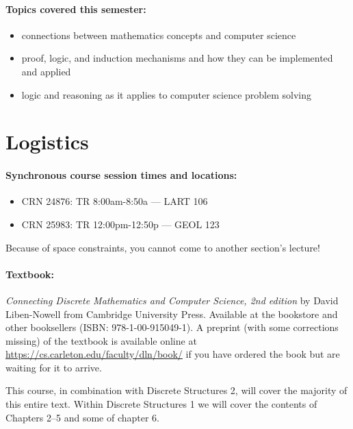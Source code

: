 \documentclass[12pt]{scrartcl}
\begin{document}
\paragraph{Topics covered this semester:}
\begin{itemize} 
\item connections between mathematics concepts and computer science
\item proof, logic, and induction mechanisms and how they can be implemented and applied
\item logic and reasoning as it applies to computer science problem solving
\end{itemize}

\clearpage
\tableofcontents

\section{Logistics}
\paragraph{Synchronous course session times and locations:}
\begin{itemize}
\item CRN 24876: TR 8:00am-8:50a --- LART 106
\item CRN 25983: TR 12:00pm-12:50p  --- GEOL 123
\end{itemize}
{\color{red} Because of space constraints, you cannot come to another section's lecture!}

\paragraph{Textbook:} \textit{Connecting Discrete Mathematics and Computer Science, 2nd edition} by David Liben-Nowell from Cambridge University Press. 
Available at the bookstore and other booksellers (ISBN: 978-1-00-915049-1). 
A preprint (with some corrections missing) of the textbook is available online at \url{https://cs.carleton.edu/faculty/dln/book/} if you have ordered the book but are waiting for it to arrive.

This course, in combination with Discrete Structures 2, will cover the majority of this entire text. Within Discrete Structures 1 we will cover the contents of Chapters 2--5 and some of chapter 6. 
\end{document}
